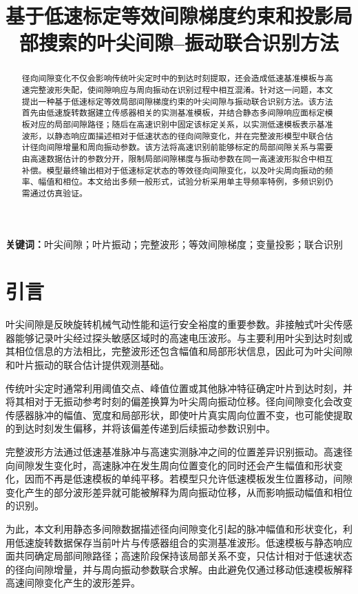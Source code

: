 \documentclass[UTF8,12pt,a4paper]{ctexart}
\title{基于低速标定等效间隙梯度约束和投影局部搜索的叶尖间隙--振动联合识别方法}
\author{}
\date{}
\begin{document}
\maketitle

\begin{abstract}
径向间隙变化不仅会影响传统叶尖定时中的到达时刻提取，还会造成低速基准模板与高速完整波形失配，使间隙响应与周向振动在识别过程中相互混淆。针对这一问题，本文提出一种基于低速标定等效局部间隙梯度约束的叶尖间隙与振动联合识别方法。该方法首先由低速旋转数据建立传感器相关的实测基准模板，并结合静态多间隙响应面标定模板对应的局部间隙路径；随后在高速识别中固定该标定关系，以实测低速模板表示基准波形，以静态响应面描述相对于低速状态的径向间隙变化，并在完整波形模型中联合估计径向间隙增量和周向振动参数。该方法将高速识别前能够标定的局部间隙关系与需要由高速数据估计的参数分开，限制局部间隙梯度与振动参数在同一高速波形拟合中相互补偿。模型最终输出相对于低速标定状态的等效径向间隙变化，以及叶尖周向振动的频率、幅值和相位。本文给出多频一般形式，试验分析采用单主导频率特例，多频识别仍需通过仿真验证。
\end{abstract}

\noindent\textbf{关键词：}叶尖间隙；叶片振动；完整波形；等效间隙梯度；变量投影；联合识别

\section{引言}

叶尖间隙是反映旋转机械气动性能和运行安全裕度的重要参数。非接触式叶尖传感器能够记录叶尖经过探头敏感区域时的高速电压波形\cite{Yu2020,Muller1997}。与主要利用叶尖到达时刻或其相位信息的方法\cite{Diamond2021}相比，完整波形还包含幅值和局部形状信息，因此可为叶尖间隙和叶片振动的联合估计提供观测基础\cite{Heller2020}。

传统叶尖定时通常利用阈值交点、峰值位置或其他脉冲特征确定叶片到达时刻，并将其相对于无振动参考时刻的偏差换算为叶尖周向振动位移。径向间隙变化会改变传感器脉冲的幅值、宽度和局部形状，即使叶片真实周向位置不变，也可能使提取的到达时刻发生偏移，并将该偏差传递到后续振动参数识别中。

完整波形方法通过低速基准脉冲与高速实测脉冲之间的位置差异识别振动。高速径向间隙发生变化时，高速脉冲在发生周向位置变化的同时还会产生幅值和形状变化，因而不再是低速模板的单纯平移。若模型只允许低速模板发生位置移动，间隙变化产生的部分波形差异就可能被解释为周向振动位移，从而影响振动幅值和相位的识别。

为此，本文利用静态多间隙数据描述径向间隙变化引起的脉冲幅值和形状变化，利用低速旋转数据保存当前叶片与传感器组合的实测基准波形。低速模板与静态响应面共同确定局部间隙路径；高速阶段保持该局部关系不变，只估计相对于低速状态的径向间隙增量，并与周向振动参数联合求解。由此避免仅通过移动低速模板解释高速间隙变化产生的波形差异。
\end{document}
